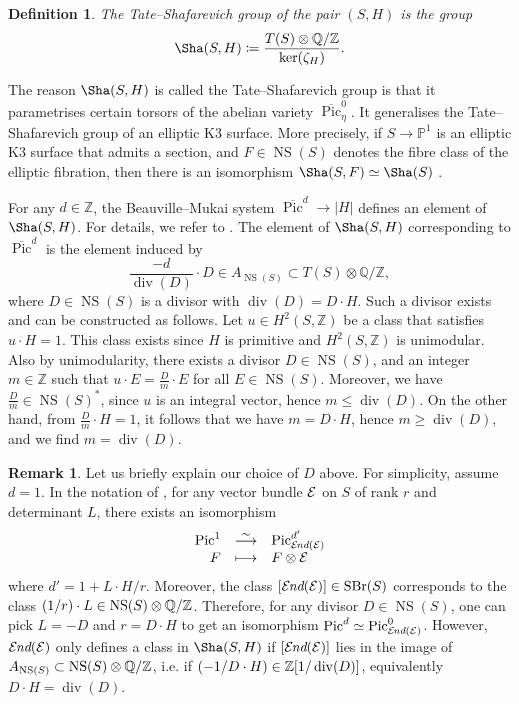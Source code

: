 \documentclass[11pt,twoside]{amsart}
\numberwithin{equation}{section}
\newtheorem{definition}[dummy]{Definition}
\theoremstyle{definition}
\newtheorem{remark}[dummy]{Remark}
\theoremstyle{plain}
\newcommand{\Z}{\ensuremath{\mathbb{Z}}}
\newcommand{\Q}{\ensuremath{\mathbb{Q}}}
\newcommand{\PP}{\ensuremath{\mathbb{P}}}
\def\NS{\operatorname{NS}}
\def\Pic{\operatorname{Pic}}
\def\olPic{\overline{\operatorname{Pic}}}
\def\SBr{\operatorname{SBr}}
\def\dv{\operatorname{div}}
\begin{document}
\begin{definition}\cite{HM23}
    The \textit{Tate--Shafarevich group} of the pair $(S,H)$ is the group $$\Sha(S,H)\coloneqq \frac{T(S)\otimes \Q/\Z}{\ker(\zeta_H)}.$$
\end{definition}

The reason $\Sha(S,H)$ is called the Tate--Shafarevich group is that it parametrises certain torsors of the abelian variety $\olPic^0_\eta$. It generalises the Tate--Shafarevich group of an elliptic K3 surface. More precisely, if $S\to \PP^1$ is an elliptic K3 surface that admits a section, and $F\in \NS(S)$ denotes the fibre class of the elliptic fibration, then there is an isomorphism $\Sha(S,F)\simeq \Sha(S)$ \cite[\S 5.1]{HM23}. 

For any $d\in \Z$, the Beauville--Mukai system $\olPic^d\to |H|$ defines an element of $\Sha(S,H)$. For details, we refer to \cite[Example 4.14]{HM23}. The element of $\Sha(S,H)$ corresponding to $\olPic^d$ is the element induced by 
\begin{equation}\label{eq:picdinshafa}
    \frac{-d}{\dv(D)}\cdot D \in A_{\NS(S)}\subset T(S)\otimes \Q/\Z,
\end{equation}
where $D\in \NS(S)$ is a divisor with $\dv(D) = D\cdot H$. Such a divisor exists and can be constructed as follows. Let $u\in H^2(S,\Z)$ be a class that satisfies $u\cdot H = 1$. This class exists since $H$ is primitive and $H^2(S,\Z)$ is unimodular. Also by unimodularity, there exists a divisor $D\in \NS(S)$, and an integer $m\in \Z$ such that $u\cdot E = \frac{D}{m}\cdot E$ for all $E\in\NS(S)$. Moreover, we have $\frac{D}{m}\in \NS(S)^*$, since $u$ is an integral vector, hence $m\leq\dv(D)$. On the other hand, from $\frac{D}{m}\cdot H = 1$, it follows that we have $m = D\cdot H$, hence $m\geq \dv(D)$, and we find $m = \dv(D)$. 


\begin{remark}
    Let us briefly explain our choice of $D$ above. For simplicity, assume $d=1$. In the notation of \cite{HM23}, for any vector bundle $\mathcal{E}$ on $S$ of rank $r$ and determinant $L$, there exists an isomorphism 
    $$\isomorphismstar{\Pic^1}{\Pic^{d'}_{\SEnd(\calE)}}{F}{F\otimes\calE}$$
    where $d'=1+L\cdot H/r$. Moreover, the class $[\SEnd(\calE)]\in \SBr(S)$ corresponds to the class $(1/r)\cdot L\in \NS(S)\otimes \bbQ/\bbZ$. Therefore, for any divisor $D\in \NS(S)$, one can pick $L=-D$ and $r=D\cdot H$ to get an isomorphism $\Pic^d\simeq \Pic^0_{\SEnd(\calE)}$. However, $\operatorname{\mathcal{E\kern -1pt}\textit{nd}}(\mathcal{E})$ only defines a class in $\Sha(S,H)$ if $[\operatorname{\mathcal{E\kern -1pt}\textit{nd}}(\mathcal{E})]$ lies in the image of $A_{\NS(S)}\subset \NS(S)\otimes \bbQ/\bbZ$, i.e. if $(-1/D\cdot H)\in \bbZ[1/\dv(D)]$, equivalently $D\cdot H=\dv(D)$. 

\end{remark}
\end{document}
